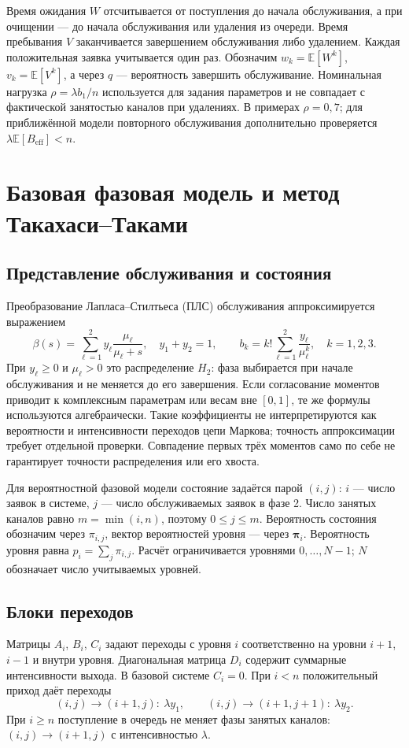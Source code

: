 Время ожидания \(W\) отсчитывается от поступления до начала обслуживания, а при очищении --- до начала обслуживания или удаления из очереди. Время пребывания \(V\) заканчивается завершением обслуживания либо удалением. Каждая положительная заявка учитывается один раз. Обозначим \(w_k=\mathbb E[W^k]\), \(v_k=\mathbb E[V^k]\), а через \(q\) --- вероятность завершить обслуживание. Номинальная нагрузка \(\rho=\lambda b_1/n\) используется для задания параметров и не совпадает с фактической занятостью каналов при удалениях. В примерах \(\rho=0{,}7\); для приближённой модели повторного обслуживания дополнительно проверяется \(\lambda\mathbb E[B_{\mathrm{eff}}]<n\).

\section{Базовая фазовая модель и метод Такахаси--Таками}
\subsection{Представление обслуживания и состояния}
Преобразование Лапласа--Стилтьеса (ПЛС) обслуживания аппроксимируется выражением
\[
\beta(s)=\sum_{\ell=1}^{2}y_\ell\frac{\mu_\ell}{\mu_\ell+s},\quad
y_1+y_2=1,\qquad
b_k=k!\sum_{\ell=1}^{2}\frac{y_\ell}{\mu_\ell^k},\quad k=1,2,3.
\]
При \(y_\ell\ge0\) и \(\mu_\ell>0\) это распределение \(H_2\): фаза выбирается при начале обслуживания и не меняется до его завершения. Если согласование моментов приводит к комплексным параметрам или весам вне \([0,1]\), те же формулы используются алгебраически. Такие коэффициенты не интерпретируются как вероятности и интенсивности переходов цепи Маркова; точность аппроксимации требует отдельной проверки. Совпадение первых трёх моментов само по себе не гарантирует точности распределения или его хвоста.

Для вероятностной фазовой модели состояние задаётся парой \((i,j)\): \(i\) --- число заявок в системе, \(j\) --- число обслуживаемых заявок в фазе 2. Число занятых каналов равно \(m=\min(i,n)\), поэтому \(0\le j\le m\). Вероятность состояния обозначим через \(\pi_{i,j}\), вектор вероятностей уровня --- через \(\boldsymbol\pi_i\). Вероятность уровня равна \(p_i=\sum_j\pi_{i,j}\). Расчёт ограничивается уровнями \(0,\ldots,N-1\); \(N\) обозначает число учитываемых уровней.

\subsection{Блоки переходов}
Матрицы \(A_i\), \(B_i\), \(C_i\) задают переходы с уровня \(i\) соответственно на уровни \(i+1\), \(i-1\) и внутри уровня. Диагональная матрица \(D_i\) содержит суммарные интенсивности выхода. В базовой системе \(C_i=0\). При \(i<n\) положительный приход даёт переходы
\[
(i,j)\to(i+1,j):\ \lambda y_1,\qquad
(i,j)\to(i+1,j+1):\ \lambda y_2.
\]
При \(i\ge n\) поступление в очередь не меняет фазы занятых каналов: \((i,j)\to(i+1,j)\) с интенсивностью \(\lambda\).

